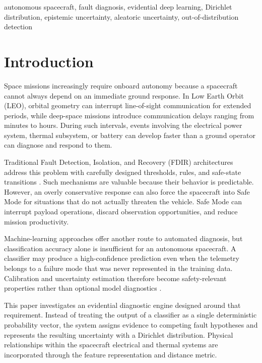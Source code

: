 \documentclass[conference]{IEEEtran}
\begin{document}
\begin{IEEEkeywords}
autonomous spacecraft, fault diagnosis, evidential deep learning,
Dirichlet distribution, epistemic uncertainty, aleatoric uncertainty,
out-of-distribution detection
\end{IEEEkeywords}

\section{Introduction}

Space missions increasingly require onboard autonomy because a spacecraft
cannot always depend on an immediate ground response. In Low Earth Orbit
(LEO), orbital geometry can interrupt line-of-sight communication for extended
periods, while deep-space missions introduce communication delays ranging from
minutes to hours. During such intervals, events involving the electrical power
system, thermal subsystem, or battery can develop faster than a ground
operator can diagnose and respond to them.

Traditional Fault Detection, Isolation, and Recovery (FDIR) architectures
address this problem with carefully designed thresholds, rules, and safe-state
transitions \cite{chien2005,muscettola1998,williams1996}. Such mechanisms are
valuable because their behavior is predictable. However, an overly conservative
response can also force the spacecraft into Safe Mode for situations that do
not actually threaten the vehicle. Safe Mode can interrupt payload operations,
discard observation opportunities, and reduce mission productivity.

Machine-learning approaches offer another route to automated diagnosis, but
classification accuracy alone is insufficient for an autonomous spacecraft.
A classifier may produce a high-confidence prediction even when the telemetry
belongs to a failure mode that was never represented in the training data.
Calibration and uncertainty estimation therefore become safety-relevant
properties rather than optional model diagnostics \cite{guo2017,hendrycks2017}.

This paper investigates an evidential diagnostic engine designed around that
requirement. Instead of treating the output of a classifier as a single
deterministic probability vector, the system assigns evidence to competing
fault hypotheses and represents the resulting uncertainty with a Dirichlet
distribution. Physical relationships within the spacecraft electrical and
thermal systems are incorporated through the feature representation and
distance metric.
\end{document}
